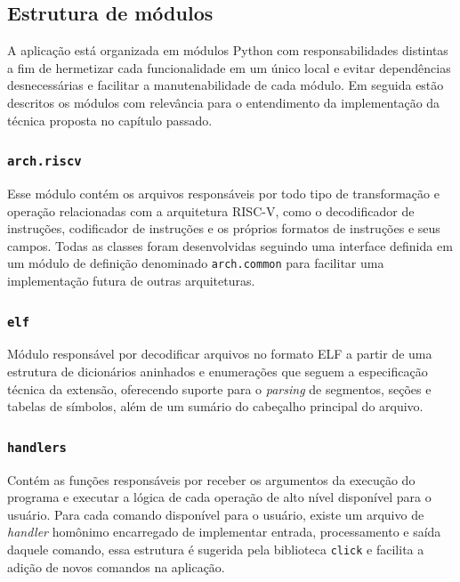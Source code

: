 \subsection{Estrutura de módulos}

A aplicação está organizada em módulos Python com responsabilidades distintas a fim de hermetizar cada funcionalidade em um único local e evitar dependências desnecessárias e facilitar a manutenabilidade de cada módulo. Em seguida estão descritos os módulos com relevância para o entendimento da implementação da técnica proposta no capítulo passado.

\subsubsection{\texttt{arch.riscv}}

Esse módulo contém os arquivos responsáveis por todo tipo de transformação e operação relacionadas com a arquitetura RISC-V, como o decodificador de instruções, codificador de instruções e os próprios formatos de instruções e seus campos. Todas as classes foram desenvolvidas seguindo uma interface definida em um módulo de definição denominado \texttt{arch.common} para facilitar uma implementação futura de outras arquiteturas.

\subsubsection{\texttt{elf}}

Módulo responsável por decodificar arquivos no formato ELF a partir de uma estrutura de dicionários aninhados e enumerações que seguem a especificação técnica da extensão, oferecendo suporte para o \textit{parsing} de segmentos, seções e tabelas de símbolos, além de um sumário do cabeçalho principal do arquivo.

\subsubsection{\texttt{handlers}}

Contém as funções responsáveis por receber os argumentos da execução do programa e executar a lógica de cada operação de alto nível disponível para o usuário. Para cada comando disponível para o usuário, existe um arquivo de \textit{handler} homônimo encarregado de implementar entrada, processamento e saída daquele comando, essa estrutura é sugerida pela biblioteca \texttt{click} e facilita a adição de novos comandos na aplicação.

